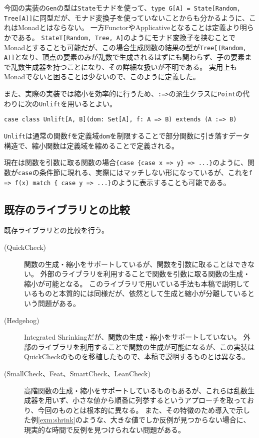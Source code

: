 \documentclass[a4paper,xelatex,ja=standard,jafont=noto]{bxjsarticle}
\theoremstyle{definition}
\begin{document}
今回の実装の\texttt{Gen}の型は\texttt{State}モナドを使って、\texttt{type G[A] = State[Random, Tree[A]]}に同型だが、モナド変換子を使っていないことからも分かるように、これはMonadとはならない。
一方FunctorやApplicativeとなることは定義より明らかである。
\texttt{StateT[Random, Tree, A]}のようにモナド変換子を挟むことでMonadとすることも可能だが、この場合生成関数の結果の型が\texttt{Tree[(Random, A)]}となり、頂点の要素のみが乱数で生成されるはずにも関わらず、子の要素まで乱数生成器を持つことになり、その詳細な扱いが不明である。
実用上もMonadでないと困ることは少ないので、このように定義した。

また、実際の実装では縮小を効率的に行うため、\texttt{:=>}の派生クラスに\texttt{Point}の代わりに次の\texttt{Unlift}を用いるとよい。

\begin{verbatim}
case class Unlift[A, B](dom: Set[A], f: A => B) extends (A :=> B)
\end{verbatim}

\texttt{Unlift}は通常の関数\texttt{f}を定義域\texttt{dom}を制限することで部分関数に引き落すデータ構造で、縮小関数は定義域を縮めることで定義される。

現在は関数を引数に取る関数の場合\texttt{\{case \{case x => y\} => ...\}}のように、関数が\texttt{case}の条件節に現れる、実際にはマッチしない形になっているが、これを\texttt{f => f(x) match \{ case y => ...\}}のように表示することも可能である。

\subsection{既存のライブラリとの比較}

既存ライブラリとの比較を行う。

\begin{description}
  \item[(QuickCheck\cite{claessen_quickcheck_2011})]
    関数の生成・縮小をサポートしているが、関数を引数に取ることはできない。
    外部のライブラリ\cite{quickcheck-higherorder_online}を利用することで関数を引数に取る関数の生成・縮小が可能となる。
    このライブラリで用いている手法も本稿で説明しているものと本質的には同様だが、依然として生成と縮小が分離しているという問題がある。
  \item[(Hedgehog\cite{hedgehog_online})]
    Integrated Shrinkingだが、関数の生成・縮小をサポートしていない。
    外部のライブラリ\cite{hedgehog-fn_online}を利用することで関数の生成が可能になるが、この実装はQuickCheckのものを移植したもので、本稿で説明するものとは異なる。
  \item[(SmallCheck\cite{runciman_smallcheck_2008}、Feat\cite{duregaard_feat_2012}、SmartCheck\cite{pike_smartcheck_2014}、LeanCheck\cite{matela_braquehais_tools_2017})]
    高階関数の生成・縮小をサポートしているものもあるが、これらは乱数生成器を用いず、小さな値から順番に列挙するというアプローチを取っており、今回のものとは根本的に異なる。
    また、その特徴のため導入で示した例\ref{exm:shrink}のような、大きな値でしか反例が見つからない場合に、現実的な時間で反例を見つけられない問題がある。
\end{description}
\end{document}
